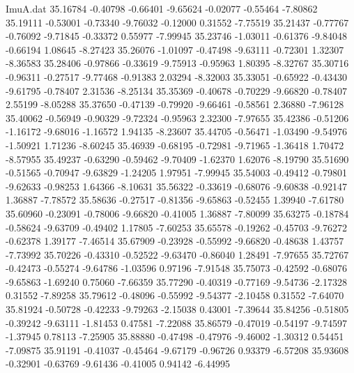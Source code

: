 \begin{filecontents}{ImuA.dat}
  35.16784   -0.40798   -0.66401   -9.65624   -0.02077   -0.55464   -7.80862
  35.19111   -0.53001   -0.73340   -9.76032   -0.12000    0.31552   -7.75519
  35.21437   -0.77767   -0.76092   -9.71845   -0.33372    0.55977   -7.99945
  35.23746   -1.03011   -0.61376   -9.84048   -0.66194    1.08645   -8.27423
  35.26076   -1.01097   -0.47498   -9.63111   -0.72301    1.32307   -8.36583
  35.28406   -0.97866   -0.33619   -9.75913   -0.95963    1.80395   -8.32767
  35.30716   -0.96311   -0.27517   -9.77468   -0.91383    2.03294   -8.32003
  35.33051   -0.65922   -0.43430   -9.61795   -0.78407    2.31536   -8.25134
  35.35369   -0.40678   -0.70229   -9.66820   -0.78407    2.55199   -8.05288
  35.37650   -0.47139   -0.79920   -9.66461   -0.58561    2.36880   -7.96128
  35.40062   -0.56949   -0.90329   -9.72324   -0.95963    2.32300   -7.97655
  35.42386   -0.51206   -1.16172   -9.68016   -1.16572    1.94135   -8.23607
  35.44705   -0.56471   -1.03490   -9.54976   -1.50921    1.71236   -8.60245
  35.46939   -0.68195   -0.72981   -9.71965   -1.36418    1.70472   -8.57955
  35.49237   -0.63290   -0.59462   -9.70409   -1.62370    1.62076   -8.19790
  35.51690   -0.51565   -0.70947   -9.63829   -1.24205    1.97951   -7.99945
  35.54003   -0.49412   -0.79801   -9.62633   -0.98253    1.64366   -8.10631
  35.56322   -0.33619   -0.68076   -9.60838   -0.92147    1.36887   -7.78572
  35.58636   -0.27517   -0.81356   -9.65863   -0.52455    1.39940   -7.61780
  35.60960   -0.23091   -0.78006   -9.66820   -0.41005    1.36887   -7.80099
  35.63275   -0.18784   -0.58624   -9.63709   -0.49402    1.17805   -7.60253
  35.65578   -0.19262   -0.45703   -9.76272   -0.62378    1.39177   -7.46514
  35.67909   -0.23928   -0.55992   -9.66820   -0.48638    1.43757   -7.73992
  35.70226   -0.43310   -0.52522   -9.63470   -0.86040    1.28491   -7.97655
  35.72767   -0.42473   -0.55274   -9.64786   -1.03596    0.97196   -7.91548
  35.75073   -0.42592   -0.68076   -9.65863   -1.69240    0.75060   -7.66359
  35.77290   -0.40319   -0.77169   -9.54736   -2.17328    0.31552   -7.89258
  35.79612   -0.48096   -0.55992   -9.54377   -2.10458    0.31552   -7.64070
  35.81924   -0.50728   -0.42233   -9.79263   -2.15038    0.43001   -7.39644
  35.84256   -0.51805   -0.39242   -9.63111   -1.81453    0.47581   -7.22088
  35.86579   -0.47019   -0.54197   -9.74597   -1.37945    0.78113   -7.25905
  35.88880   -0.47498   -0.47976   -9.46002   -1.30312    0.54451   -7.09875
  35.91191   -0.41037   -0.45464   -9.67179   -0.96726    0.93379   -6.57208
  35.93608   -0.32901   -0.63769   -9.61436   -0.41005    0.94142   -6.44995

\end{filecontents}
